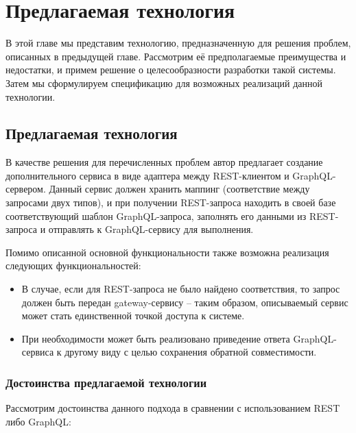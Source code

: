 

\chapter{Предлагаемая технология} \label{ch:ch2}

В этой главе мы представим технологию, предназначенную для решения проблем, описанных в предыдущей главе.
Рассмотрим её предполагаемые преимущества и недостатки, и примем решение о целесообразности разработки такой системы.
Затем мы сформулируем спецификацию для возможных реализаций данной технологии.


\section{Предлагаемая технология}\label{sec:proposed-technology}

В качестве решения для перечисленных проблем автор предлагает создание дополнительного сервиса в виде адаптера между REST-клиентом и GraphQL-сервером.
Данный сервис должен хранить маппинг (соответствие между запросами двух типов), и при получении REST-запроса находить в своей базе соответствующий шаблон GraphQL-запроса, заполнять его данными из REST-запроса и отправлять к GraphQL-сервису для выполнения.

Помимо описанной основной функциональности также возможна реализация следующих функциональностей:

\begin{itemize}
    \item В случае, если для REST-запроса не было найдено соответствия, то запрос должен быть передан gateway-сервису – таким образом, описываемый сервис может стать единственной точкой доступа к системе.
    \item При необходимости может быть реализовано приведение ответа GraphQL-сервиса к другому виду с целью сохранения обратной совместимости.
\end{itemize}

\subsection{Достоинства предлагаемой технологии}\label{subsec:proposed-technology-advantages}

Рассмотрим достоинства данного подхода в сравнении с использованием REST либо GraphQL:

